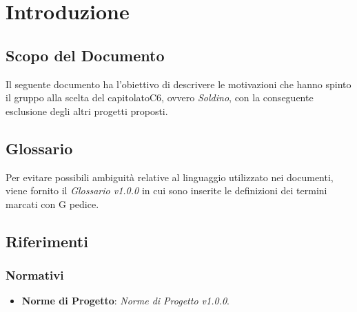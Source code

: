 \section{Introduzione}
\subsection{Scopo del Documento}
	Il seguente documento ha l'obiettivo di descrivere le motivazioni che hanno spinto il gruppo alla scelta del capitolato\glosp C6, ovvero \textit{Soldino}, con la conseguente esclusione degli altri progetti proposti.
	
\subsection{Glossario}
	Per evitare possibili ambiguità relative al linguaggio utilizzato nei documenti, viene fornito il \textit{Glossario v1.0.0} in cui sono inserite le definizioni dei termini marcati con G pedice.
	
\subsection{Riferimenti}
\subsubsection{Normativi}
\begin{itemize}
	\item \textbf{Norme di Progetto}: \textit{Norme di Progetto v1.0.0}.
\end{itemize}
	
